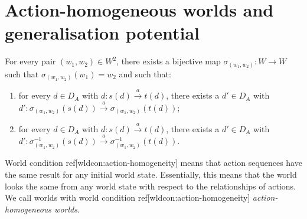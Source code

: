 \chapter{Action-homogeneous worlds and generalisation potential}




\begin{world_condition}\label{wldcon:action-homogeneity}
	For every pair $(w_{1}, w_{2}) \in W^{2}$, there exists a bijective map $\sigma_{(w_{1},w_{2})}: W \to W$ such that $\sigma_{(w_{1},w_{2})}(w_{1})=w_{2}$ and such that:

	\begin{enumerate}
		\item for every $d \in D_{A}$ with $d: s(d) \xrightarrow{a} t(d)$, there exists a $d' \in D_{A}$ with $d': \sigma_{(w_{1}, w_{2})}(s(d)) \xrightarrow{a} \sigma_{(w_{1}, w_{2})}(t(d))$;

		\item for every $d \in D_{A}$ with $d: s(d) \xrightarrow{a} t(d)$, there exists a $d' \in D_{A}$ with $d': \sigma^{-1}_{(w_{1}, w_{2})}(s(d)) \xrightarrow{a} \sigma^{-1}_{(w_{1}, w_{2})}(t(d))$.
	\end{enumerate}
\end{world_condition}

World condition ref[wldcon:action-homogeneity] means that action sequences have the same result for any initial world state.
Essentially, this means that the world looks the same from any world state with respect to the relationships of actions.
We call worlds with world condition ref[wldcon:action-homogeneity] \textit{action-homogeneous worlds}.

